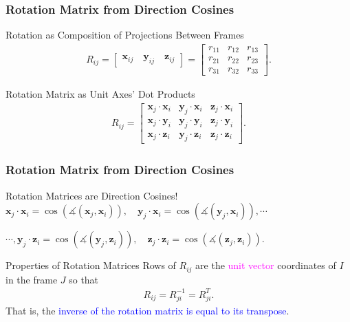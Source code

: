 \begin{frame}
	\frametitle{Rotation Matrix from Direction Cosines}
	\begin{block}{Rotation as Composition of Projections Between Frames}
		\begin{align}
			R_{ij} = \begin{bmatrix}
				\bm{x}_{ij} \quad  \bm{y}_{ij} \quad \bm{z}_{ij}
			\end{bmatrix} = \begin{bmatrix}
				r_{11} &  r_{12} & r_{13} \\
				r_{21} & r_{22} &  r_{23} \\
				r_{31} & r_{32} &  r_{33}
			\end{bmatrix}.
			\label{eq:rotation_compoz}
		\end{align}
	\end{block}
	
	\begin{block}{Rotation Matrix as Unit Axes' Dot Products}
		\begin{align}
			R_{ij} = \begin{bmatrix}
				\bm{x}_j \cdot \bm{x}_i & \bm{y}_j \cdot \bm{x}_i & \bm{z}_j \cdot \bm{x}_i \\
				\bm{x}_j \cdot \bm{y}_i & \bm{y}_j \cdot \bm{y}_i & \bm{z}_j \cdot \bm{y}_i \\
				\bm{x}_j \cdot \bm{z}_i & \bm{y}_j \cdot \bm{z}_i & \bm{z}_j \cdot \bm{z}_i 
			\end{bmatrix}.
			\label{eq:direction_cosines}
		\end{align}
	\end{block}
\end{frame}

\begin{frame}
	\frametitle{Rotation Matrix from Direction Cosines}
	\begin{block}{Rotation Matrices are Direction Cosines!}
		$\bm{x}_j \cdot \bm{x}_i = \cos(\measuredangle\left(\bm{x}_j, \bm{x}_i\right)), \quad 	\bm{y}_j \cdot \bm{x}_i = \cos(\measuredangle\left(\bm{y}_j, \bm{x}_i\right)), \cdots$
		
		$\cdots, \bm{y}_j \cdot \bm{z}_i = \cos(\measuredangle\left(\bm{y}_j, \bm{z}_i\right)), \quad 	\bm{z}_j \cdot \bm{z}_i = \cos(\measuredangle\left(\bm{z}_j, \bm{z}_i\right)).$
	\end{block}
	
	\begin{block}{Properties of Rotation Matrices}
		Rows of $R_{ij}$ are the \textcolor{magenta}{unit vector} coordinates of $I$  in the frame $J$ so that 
		\begin{align}
			R_{ij} =  R_{ji}^{-1} = R_{ji}^T.
		\end{align}
		That is, the \textcolor{blue}{inverse of the rotation matrix is equal to its transpose}. 
	\end{block}
\end{frame}

